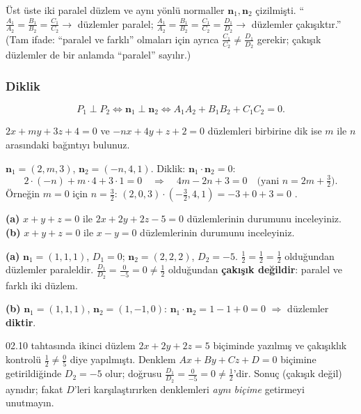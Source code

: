 \begin{tahta}
Üst üste iki paralel düzlem ve aynı yönlü normaller $\mathbf n_1,\mathbf n_2$ çizilmişti.
``$\frac{A_1}{A_2}=\frac{B_1}{B_2}=\frac{C_1}{C_2}\to$ düzlemler paralel; $\frac{A_1}{A_2}=\frac{B_1}{B_2}=\frac{C_1}{C_2}=\frac{D_1}{D_2}\to$ düzlemler çakışıktır.''
(Tam ifade: ``paralel ve farklı'' olmaları için ayrıca $\frac{C_1}{C_2}\ne\frac{D_1}{D_2}$ gerekir; çakışık düzlemler de bir anlamda ``paralel'' sayılır.)
\end{tahta}

\subsubsection{Diklik}

\begin{teorem}
\[ P_1\perp P_2\iff\mathbf n_1\perp\mathbf n_2\iff A_1A_2+B_1B_2+C_1C_2=0 . \]
\end{teorem}

\begin{soru}
$2x+my+3z+4=0$ ve $-nx+4y+z+2=0$ düzlemleri birbirine dik ise $m$ ile $n$ arasındaki bağıntıyı bulunuz.
\end{soru}
\begin{cevap}
$\mathbf n_1=(2,m,3)$, $\mathbf n_2=(-n,4,1)$. Diklik: $\mathbf n_1\cdot\mathbf n_2=0$:
\[ 2\cdot(-n)+m\cdot4+3\cdot1=0\quad\Longrightarrow\quad\boxed{4m-2n+3=0}\quad\Big(\text{yani } n=2m+\tfrac32\Big). \]
Örneğin $m=0$ için $n=\frac32$: $(2,0,3)\cdot(-\frac32,4,1)=-3+0+3=0$ \checkmark.
\end{cevap}

\begin{soru}
\textbf{(a)} $x+y+z=0$ ile $2x+2y+2z-5=0$ düzlemlerinin durumunu inceleyiniz.
\textbf{(b)} $x+y+z=0$ ile $x-y=0$ düzlemlerinin durumunu inceleyiniz.
\end{soru}
\begin{cevap}
\textbf{(a)} $\mathbf n_1=(1,1,1)$, $D_1=0$; $\mathbf n_2=(2,2,2)$, $D_2=-5$.
$\frac{1}{2}=\frac12=\frac12$ olduğundan düzlemler paraleldir. $\frac{D_1}{D_2}=\frac{0}{-5}=0\neq\frac12$ olduğundan \textbf{çakışık değildir}: paralel ve farklı iki düzlem.

\textbf{(b)} $\mathbf n_1=(1,1,1)$, $\mathbf n_2=(1,-1,0)$: $\mathbf n_1\cdot\mathbf n_2=1-1+0=0$ $\Rightarrow$ düzlemler \textbf{diktir}.
\end{cevap}
\begin{bilgi}
02.10 tahtasında ikinci düzlem $2x+2y+2z=5$ biçiminde yazılmış ve çakışıklık kontrolü $\frac12\neq\frac05$ diye yapılmıştı. Denklem $Ax+By+Cz+D=0$ biçimine getirildiğinde $D_2=-5$ olur; doğrusu $\frac{D_1}{D_2}=\frac{0}{-5}=0\neq\frac12$'dir. Sonuç (çakışık değil) aynıdır; fakat $D$'leri karşılaştırırken denklemleri \emph{aynı biçime} getirmeyi unutmayın.
\end{bilgi}

